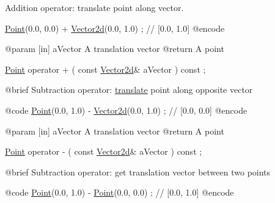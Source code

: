 Addition operator\+: translate point along vector. 


\begin{DoxyCode}
                        \hyperlink{classlibrary_1_1math_1_1geom_1_1d2_1_1objects_1_1_point_a4998aefdf80bdfd967f21d49fa050398}{Point}(0.0, 0.0) + \hyperlink{namespacelibrary_1_1math_1_1obj_a2fa27512c4f4b07db35d602cfdd2c293}{Vector2d}(0.0, 1.0) ; \textcolor{comment}{// [0.0, 1.0]}
    @encode
   
    @param              [in] aVector A translation vector
    @\textcolor{keywordflow}{return}             A point

\hyperlink{classlibrary_1_1math_1_1geom_1_1d2_1_1objects_1_1_point_a4998aefdf80bdfd967f21d49fa050398}{Point}                   operator +                                  (   \textcolor{keyword}{const}   
      \hyperlink{namespacelibrary_1_1math_1_1obj_a2fa27512c4f4b07db35d602cfdd2c293}{Vector2d}&                   aVector                                     ) \textcolor{keyword}{const} ;

    @brief              Subtraction \textcolor{keyword}{operator}: \hyperlink{classlibrary_1_1math_1_1geom_1_1d2_1_1objects_1_1_point_a8e17705a1762fdfdcbed68881afca245}{translate} point along opposite vector
   
    @code
                        \hyperlink{classlibrary_1_1math_1_1geom_1_1d2_1_1objects_1_1_point_a4998aefdf80bdfd967f21d49fa050398}{Point}(0.0, 1.0) - \hyperlink{namespacelibrary_1_1math_1_1obj_a2fa27512c4f4b07db35d602cfdd2c293}{Vector2d}(0.0, 1.0) ; \textcolor{comment}{// [0.0, 0.0]}
    @encode
   
    @param              [in] aVector A translation vector
    @\textcolor{keywordflow}{return}             A point

\hyperlink{classlibrary_1_1math_1_1geom_1_1d2_1_1objects_1_1_point_a4998aefdf80bdfd967f21d49fa050398}{Point}                   operator -                                  (   \textcolor{keyword}{const}   
      \hyperlink{namespacelibrary_1_1math_1_1obj_a2fa27512c4f4b07db35d602cfdd2c293}{Vector2d}&                   aVector                                     ) \textcolor{keyword}{const} ;

    @brief              Subtraction \textcolor{keyword}{operator}: \textcolor{keyword}{get} translation vector between two points
   
    @code
                        \hyperlink{classlibrary_1_1math_1_1geom_1_1d2_1_1objects_1_1_point_a4998aefdf80bdfd967f21d49fa050398}{Point}(0.0, 1.0) - \hyperlink{classlibrary_1_1math_1_1geom_1_1d2_1_1objects_1_1_point_a4998aefdf80bdfd967f21d49fa050398}{Point}(0.0, 0.0)  ; \textcolor{comment}{// [0.0, 1.0]}
    @encode
   

\end{DoxyCode}
